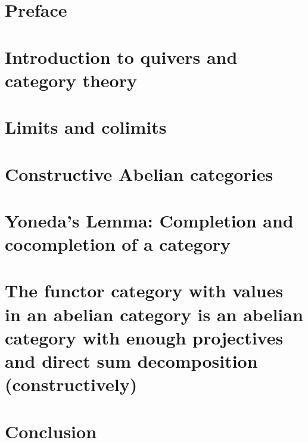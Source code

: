 \documentclass{article}
\begin{document}
\tableofcontents\label{toc}
\section{Preface}

\section{Introduction to quivers and category theory}


\section{Limits and colimits}



\section{Constructive Abelian categories}


%

\section{Yoneda's Lemma: Completion and cocompletion of a category}


\section{The functor category with values in an abelian category is an abelian category with enough projectives and direct sum decomposition (constructively)}


\section{Conclusion}
\end{document}
